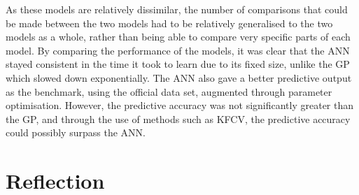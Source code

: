 \documentclass[11pt]{article}
\begin{document}
As these models are relatively dissimilar, the number of comparisons that could be made between the two models had to be relatively generalised to the two models as a whole, rather than being able to compare very specific parts of each model. By comparing the performance of the models, it was clear that the ANN stayed consistent in the time it took to learn due to its fixed size, unlike the GP which slowed down exponentially. The ANN also gave a better predictive output as the benchmark, using the official data set, augmented through parameter optimisation. However, the predictive accuracy was not significantly greater than the GP, and through the use of methods such as KFCV, the predictive accuracy could possibly surpass the ANN. 

\section{Reflection }
\end{document}
